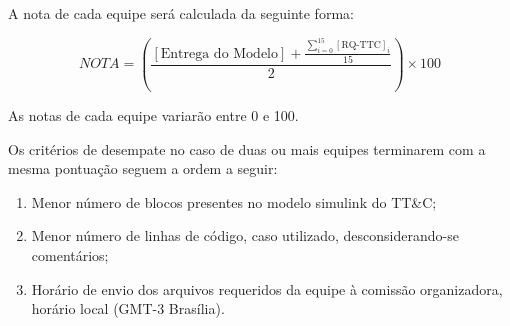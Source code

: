 A nota de cada equipe será calculada da seguinte forma:

\begin{equation}
    NOTA=\left (\frac{[\textrm{Entrega do Modelo}] + \frac{\sum_{i=0}^{15}[\textrm{RQ-TTC}]_i}{15}}{2} \right ) \times 100
\end{equation}

As notas de cada equipe variarão entre 0 e 100.

Os critérios de desempate no caso de duas ou mais equipes terminarem com a mesma pontuação seguem a ordem a seguir:

\begin{enumerate}[label=(\roman*)]
    \item Menor número de blocos presentes no modelo simulink do TT\&C;
    \item Menor número de linhas de código, caso utilizado, desconsiderando-se comentários;
    \item Horário de envio dos arquivos requeridos da equipe à comissão organizadora, horário local (GMT-3 Brasília).
\end{enumerate}